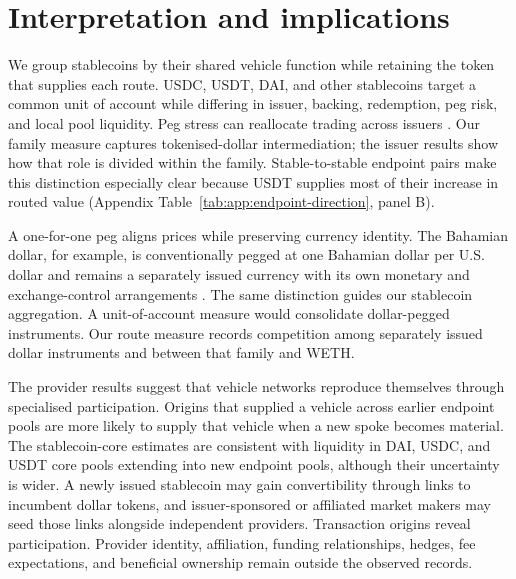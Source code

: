 \section{Interpretation and implications}
\label{sec:discussion}

We group stablecoins by their shared vehicle function while retaining the token that supplies each route. USDC, USDT, DAI, and other stablecoins target a common unit of account while differing in issuer, backing, redemption, peg risk, and local pool liquidity. Peg stress can reallocate trading across issuers \citep{LiuMakarovSchoar2023Terra,AnaduEtAl2023StablecoinRuns}. Our family measure captures tokenised-dollar intermediation; the issuer results show how that role is divided within the family. Stable-to-stable endpoint pairs make this distinction especially clear because USDT supplies most of their increase in routed value (Appendix Table~\ref{tab:app:endpoint-direction}, panel B).

A one-for-one peg aligns prices while preserving currency identity. The Bahamian dollar, for example, is conventionally pegged at one Bahamian dollar per U.S. dollar and remains a separately issued currency with its own monetary and exchange-control arrangements \citep{IMF2025BahamasArticleIV}. The same distinction guides our stablecoin aggregation. A unit-of-account measure would consolidate dollar-pegged instruments. Our route measure records competition among separately issued dollar instruments and between that family and WETH.

The provider results suggest that vehicle networks reproduce themselves through specialised participation. Origins that supplied a vehicle across earlier endpoint pools are more likely to supply that vehicle when a new spoke becomes material. The stablecoin-core estimates are consistent with liquidity in DAI, USDC, and USDT core pools extending into new endpoint pools, although their uncertainty is wider. A newly issued stablecoin may gain convertibility through links to incumbent dollar tokens, and issuer-sponsored or affiliated market makers may seed those links alongside independent providers. Transaction origins reveal participation. Provider identity, affiliation, funding relationships, hedges, fee expectations, and beneficial ownership remain outside the observed records.

